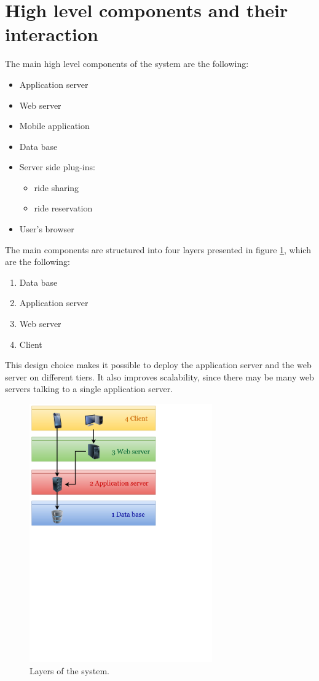\section{High level components and their interaction}
\label{sec:high-level}

The main high level components of the system are the following:
\begin{itemize}
	\item Application server
	\item Web server
	\item Mobile application
	\item Data base
	\item Server side plug-ins:
		\begin{itemize}
		\item ride sharing
		\item ride reservation
		\end{itemize}
	\item User's browser
\end{itemize}

The main components are structured into four layers presented in figure \ref{fig:layers}, which are the following:
\begin {enumerate}
	\item Data base
	\item Application server
	\item Web server
	\item Client
\end{enumerate}

This design choice makes it possible to deploy the application server and the web server on different tiers. It also improves scalability, since there may be many web servers talking to a single application server.

\begin{figure}[h]
\centering
\includegraphics[width=0.7\textwidth]{diagrams/layers.pdf}
\caption{Layers of the system.}
\label{fig:layers}
\end{figure}

